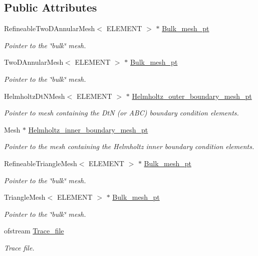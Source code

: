\subsection*{Public Attributes}
\begin{DoxyCompactItemize}
\item 
Refineable\+Two\+D\+Annular\+Mesh$<$ E\+L\+E\+M\+E\+NT $>$ $\ast$ \hyperlink{classScatteringProblem_a8c61657a1d09ce49a5871ca3febe5658}{Bulk\+\_\+mesh\+\_\+pt}
\begin{DoxyCompactList}\small\item\em Pointer to the \char`\"{}bulk\char`\"{} mesh. \end{DoxyCompactList}\item 
Two\+D\+Annular\+Mesh$<$ E\+L\+E\+M\+E\+NT $>$ $\ast$ \hyperlink{classScatteringProblem_aac3ed9baf77bc66421a7d980ca359bf9}{Bulk\+\_\+mesh\+\_\+pt}
\begin{DoxyCompactList}\small\item\em Pointer to the \char`\"{}bulk\char`\"{} mesh. \end{DoxyCompactList}\item 
Helmholtz\+Dt\+N\+Mesh$<$ E\+L\+E\+M\+E\+NT $>$ $\ast$ \hyperlink{classScatteringProblem_a9692c8592b57a4363e557e5b012c744b}{Helmholtz\+\_\+outer\+\_\+boundary\+\_\+mesh\+\_\+pt}
\begin{DoxyCompactList}\small\item\em Pointer to mesh containing the DtN (or A\+BC) boundary condition elements. \end{DoxyCompactList}\item 
Mesh $\ast$ \hyperlink{classScatteringProblem_a56b5fc73bbb51b701a43dc38f9815104}{Helmholtz\+\_\+inner\+\_\+boundary\+\_\+mesh\+\_\+pt}
\begin{DoxyCompactList}\small\item\em Pointer to the mesh containing the Helmholtz inner boundary condition elements. \end{DoxyCompactList}\item 
Refineable\+Triangle\+Mesh$<$ E\+L\+E\+M\+E\+NT $>$ $\ast$ \hyperlink{classScatteringProblem_aec2b62d5a05a10625ee43aab7f3c7a97}{Bulk\+\_\+mesh\+\_\+pt}
\begin{DoxyCompactList}\small\item\em Pointer to the \char`\"{}bulk\char`\"{} mesh. \end{DoxyCompactList}\item 
Triangle\+Mesh$<$ E\+L\+E\+M\+E\+NT $>$ $\ast$ \hyperlink{classScatteringProblem_a75f2722194e3906ef170f016f2ce6d74}{Bulk\+\_\+mesh\+\_\+pt}
\begin{DoxyCompactList}\small\item\em Pointer to the \char`\"{}bulk\char`\"{} mesh. \end{DoxyCompactList}\item 
ofstream \hyperlink{classScatteringProblem_a47bb2e90c5817c97ef162136cb331286}{Trace\+\_\+file}
\begin{DoxyCompactList}\small\item\em Trace file. \end{DoxyCompactList}\end{DoxyCompactItemize}


